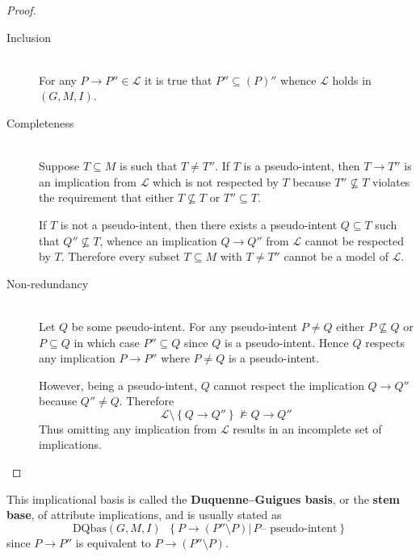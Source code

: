 \documentclass[a4paper]{article}
\newcommand{\obj}[1]{{\left\{ #1 \right \}}}
\newcommand{\brac}[1]{{\left ( #1 \right )}}
\newcommand{\induc}[1]{{\left . #1 \right \vert}}
\newcommand{\Lcal}{\mathcal{L}}
\newcommand{\defn}{\mathop{\overset{\Delta}{=}}\nolimits}
\begin{document}
\begin{proof}\hfill
\begin{description}
\item[Inclusion] \hfill \\ For any $P\to P''\in \Lcal$ it is true that $P''\subseteq \brac{P}''$ whence $\Lcal$ holds in $(G,M,I)$.

\item[Completeness] \hfill \\ Suppose $T\subseteq M$ is such that $T\neq T''$. If $T$ is a pseudo-intent, then $T\to T''$ is an implication from $\Lcal$ which is not respected by $T$ because $T''\not\subseteq T$ violates the requirement that either $T\not\subseteq T$ or $T''\subseteq T$.

If $T$ is not a pseudo-intent, then there exists a pseudo-intent $Q\subseteq T$ such that $Q''\not\subseteq T$, whence an implication $Q\to Q''$ from $\Lcal$ cannot be respected by $T$. Therefore every subset $T\subseteq M$ with $T\neq T''$ cannot be a model of $\Lcal$.

\item[Non-redundancy] \hfill \\ Let $Q$ be some pseudo-intent. For any pseudo-intent $P\neq Q$ either $P\not\subseteq Q$ or $P\subseteq Q$ in which case $P''\subseteq Q$ since $Q$ is a pseudo-intent. Hence $Q$ respects any implication $P\to P''$ where $P\neq Q$ is a pseudo-intent.

However, being a pseudo-intent, $Q$ cannot respect the implication $Q\to Q''$ because $Q''\neq Q$. Therefore \[\Lcal\setminus \obj{Q\to Q''}\not\models Q\to Q''\] Thus omitting any implication from $\Lcal$ results in an incomplete set of implications.
\end{description}
\end{proof}

This implicational basis is called the \textbf{Duquenne–Guigues basis}, or the \textbf{stem base}, of attribute implications, and is usually stated as \[\text{DQbas}(G,M,I)\defn \obj{\induc{ P\to \brac{P''\setminus P} }\, P \text{-- pseudo-intent} }\] since $P\to P''$ is equivalent to $P\to\brac{P''\setminus P}$.
\end{document}
